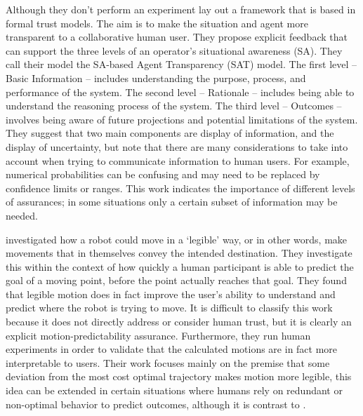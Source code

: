 Although they don't perform an experiment \citet{Chen2014-dk} lay out a framework that is based in formal trust models. The aim is to make the situation and agent more transparent to a collaborative human user. They propose explicit feedback that can support the three levels of an operator's situational awareness (SA). They call their model the SA-based Agent Transparency (SAT) model. The first level -- Basic Information -- includes understanding the purpose, process, and performance of the system. The second level -- Rationale -- includes being able to understand the reasoning process of the system. The third level -- Outcomes -- involves being aware of future projections and potential limitations of the system. They suggest that two main components are display of information, and the display of uncertainty, but note that there are many considerations to take into account when trying to communicate information to human users. For example, numerical probabilities can be confusing and may need to be replaced by confidence limits or ranges. This work indicates the importance of different levels of assurances; in some situations only a certain subset of information may be needed.

\citet{Dragan2013-wd} investigated how a robot could move in a `legible' way, or in other words, make movements that in themselves convey the intended destination. They investigate this within the context of how quickly a human participant is able to predict the goal of a moving point, before the point actually reaches that goal. They found that legible motion does in fact improve the user's ability to understand and predict where the robot is trying to move. It is difficult to classify this work because it does not directly address or consider human trust, but it is clearly an explicit motion-predictability assurance. Furthermore, they run human experiments in order to validate that the calculated motions are in fact more interpretable to users. Their work focuses mainly on the premise that some deviation from the most cost optimal trajectory makes motion more legible, this idea can be extended in certain situations where humans rely on redundant or non-optimal behavior to predict outcomes, although it is contrast to \citet{Wu2016-ei}.

